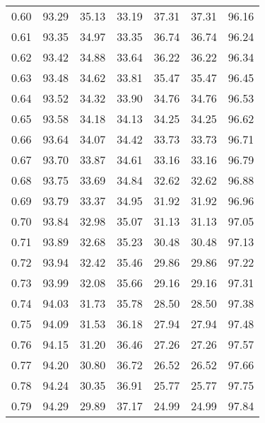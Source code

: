 \begin{tabular}{|c|c|c|c|c|c|c|}
      0.60 &     93.29 &     35.13 &      33.19 &   37.31 &      37.31 &         96.16 \\
      0.61 &     93.35 &     34.97 &      33.35 &   36.74 &      36.74 &         96.24 \\
      0.62 &     93.42 &     34.88 &      33.64 &   36.22 &      36.22 &         96.34 \\
      0.63 &     93.48 &     34.62 &      33.81 &   35.47 &      35.47 &         96.45 \\
      0.64 &     93.52 &     34.32 &      33.90 &   34.76 &      34.76 &         96.53 \\
      0.65 &     93.58 &     34.18 &      34.13 &   34.25 &      34.25 &         96.62 \\
      0.66 &     93.64 &     34.07 &      34.42 &   33.73 &      33.73 &         96.71 \\
      0.67 &     93.70 &     33.87 &      34.61 &   33.16 &      33.16 &         96.79 \\
      0.68 &     93.75 &     33.69 &      34.84 &   32.62 &      32.62 &         96.88 \\
      0.69 &     93.79 &     33.37 &      34.95 &   31.92 &      31.92 &         96.96 \\
      0.70 &     93.84 &     32.98 &      35.07 &   31.13 &      31.13 &         97.05 \\
      0.71 &     93.89 &     32.68 &      35.23 &   30.48 &      30.48 &         97.13 \\
      0.72 &     93.94 &     32.42 &      35.46 &   29.86 &      29.86 &         97.22 \\
      0.73 &     93.99 &     32.08 &      35.66 &   29.16 &      29.16 &         97.31 \\
      0.74 &     94.03 &     31.73 &      35.78 &   28.50 &      28.50 &         97.38 \\
      0.75 &     94.09 &     31.53 &      36.18 &   27.94 &      27.94 &         97.48 \\
      0.76 &     94.15 &     31.20 &      36.46 &   27.26 &      27.26 &         97.57 \\
      0.77 &     94.20 &     30.80 &      36.72 &   26.52 &      26.52 &         97.66 \\
      0.78 &     94.24 &     30.35 &      36.91 &   25.77 &      25.77 &         97.75 \\
      0.79 &     94.29 &     29.89 &      37.17 &   24.99 &      24.99 &         97.84 \\

\end{tabular}
